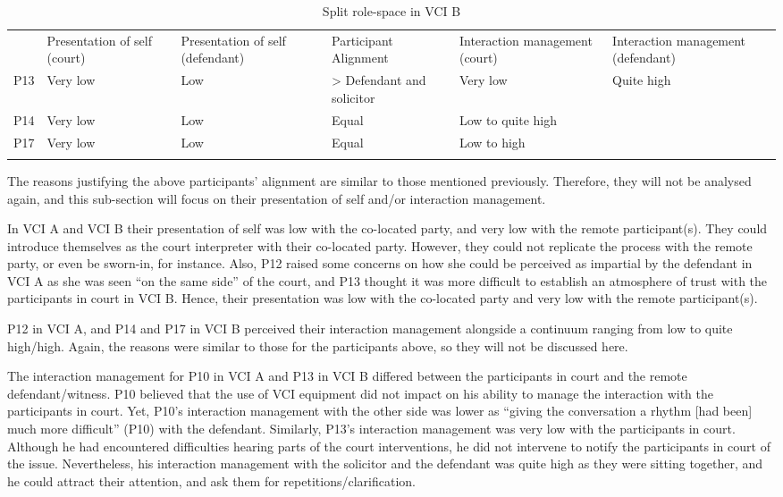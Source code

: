 \documentclass[output=paper]{langsci/langscibook}
\begin{document}
\begin{table}
\begin{tabularx}{\textwidth}{XXXXXX}
\lsptoprule
& {Presentation of self (court)} & {Presentation of self (defendant)} & {Participant Alignment} & \multicolumn{1}{X}{{Interaction management (court)}} & {Interaction management (defendant)}\\

P13 & Very low & Low & > Defendant and solicitor & \multicolumn{1}{X}{Very low} & Quite high\\
P14 & Very low & Low & Equal & \multicolumn{2}{X}{Low to quite high} \\
P17 & Very low & Low & Equal & \multicolumn{2}{X}{Low to high}\\
\lspbottomrule
\end{tabularx}

\caption{Split role-space in \textsc{VCI} B\label{tab:devaux:5}}
\end{table}

The reasons justifying the above participants’ alignment are similar to those mentioned previously. Therefore, they will not be analysed again, and this sub-section will focus on their presentation of self and/or interaction management.

In \textsc{VCI} A and \textsc{VCI} B their presentation of self was low with the co-located party, and very low with the remote participant(s). They could introduce themselves as the court interpreter with their co-located party. However, they could not replicate the process with the remote party, or even be sworn-in, for instance. Also, P12 raised some concerns on how she could be perceived as impartial by the defendant in \textsc{VCI} A as she was seen “on the same side” of the court, and P13 thought it was more difficult to establish an atmosphere of trust with the participants in court in \textsc{VCI} B. Hence, their presentation was low with the co-located party and very low with the remote participant(s).

P12 in \textsc{VCI} A, and P14 and P17 in \textsc{VCI} B perceived their interaction management alongside a continuum ranging from low to quite high/high. Again, the reasons were similar to those for the participants above, so they will not be discussed here. 

The interaction management for P10 in \textsc{VCI} A and P13 in \textsc{VCI} B differed between the participants in court and the remote defendant/witness. P10 believed that the use of \textsc{VCI} equipment did not impact on his ability to manage the interaction with the participants in court. Yet, P10’s interaction management with the other side was lower as “giving the conversation a rhythm [had been] much more difficult” (P10) with the defendant. Similarly, P13’s interaction management was very low with the participants in court. Although he had encountered difficulties hearing parts of the court interventions, he did not intervene to notify the participants in court of the issue. Nevertheless, his interaction management with the solicitor and the defendant was quite high as they were sitting together, and he could attract their attention, and ask them for repetitions/clarification.
\end{document}
